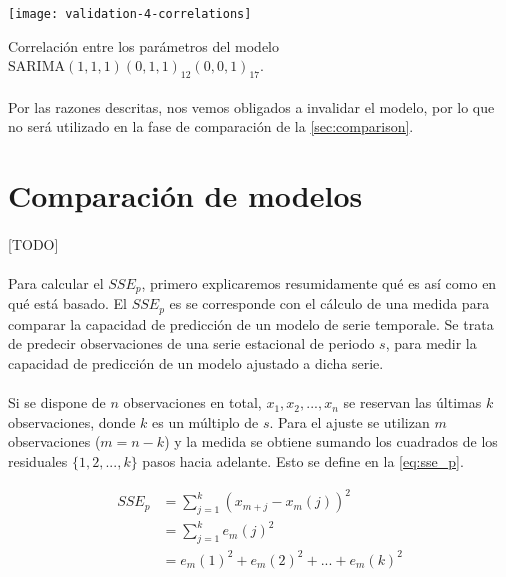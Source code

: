 \documentclass[a4paper, spanish]{article}
\begin{document}
      \begin{table}[htb!]
        \centering
        \texttt{[image: validation-4-correlations]}
        \caption{Correlación entre los parámetros del modelo $\text{SARIMA}(1, 1, 1)(0, 1, 1)_{12}(0, 0, 1)_{17}$.}
        \label{table:validation_4_correlations}
      \end{table}

      \paragraph{}
      Por las razones descritas, nos vemos obligados a invalidar el modelo, por lo que no será utilizado en la fase de comparación de la \autoref{sec:comparison}.

  \section{Comparación de modelos}
  \label{sec:comparison}
    \paragraph{}
    [TODO]


    \paragraph{}
    Para calcular el $SSE_p$, primero explicaremos resumidamente qué es así como en qué está basado. El $SSE_p$ es se corresponde con el cálculo de una medida para comparar la capacidad de predicción de un modelo de serie temporale. Se trata de predecir observaciones de una serie estacional de periodo $s$, para medir la capacidad de predicción de un modelo ajustado a dicha serie.

    \paragraph{}
    Si se dispone de $n$ observaciones en total, $x_1, x_2, ..., x_n$ se reservan las últimas $k$ observaciones, donde $k$ es un múltiplo de $s$. Para el ajuste se utilizan $m$ observaciones ($m = n - k$) y la medida se obtiene sumando los cuadrados de los residuales $\{1, 2, ..., k\}$ pasos hacia adelante. Esto se define en la \autoref{eq:sse_p}.

    \begin{equation}
    \label{eq:sse_p}
      \begin{split}
        SSE_p
        &= \sum_{j = 1} ^ k (x_{m + j} - x_{m}(j)) ^ 2 \\
        &= \sum_{j = 1} ^ k e_m(j) ^ 2 \\
        &= e_m(1) ^ 2 + e_m(2) ^ 2 + ... + e_m(k) ^ 2
      \end{split}
    \end{equation}
\end{document}
